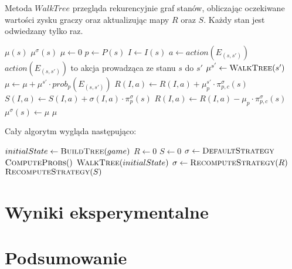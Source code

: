 \documentclass[licencjacka]{pracamgr}
\begin{document}
$\,$ \\

\noindent
Metoda $WalkTree$ przegląda rekurencyjnie graf stanów, obliczając oczekiwane wartości zysku graczy oraz
aktualizując mapy $R$ oraz $S$. Każdy stan jest odwiedzany tylko raz. \\

\begin{algorithmic}
            \State \Return $\mu(s)$
        \EndIf
            \State \Return $\mu^{\sigma}(s)$
        \EndIf
        \State $\mu \gets 0$ 
        \State $p \gets P(s)$
        \State $I \gets I(s)$
            \State $a \gets action(E_{(s, s')})$
            \Comment $action(E_{(s, s')})$ to akcja prowadząca ze stanu $s$ do $s'$
            \State $\mu^{s'} \gets \Call{WalkTree}{s'}$
            \State $\mu \gets \mu + \mu^{s'} \cdot prob_p(E_{(s, s')})$
                \State $R(I, a) \gets R(I, a) + \mu^{s'}_p \cdot \pi_{p,c}^{\sigma}(s)$
                \State $S(I, a) \gets S(I, a) + \sigma(I, a) \cdot \pi_p^{\sigma}(s)$
            \EndIf
        \EndFor
            \State $R(I, a) \gets R(I, a) - \mu_p \cdot \pi_{p,c}^{\sigma}(s)$
        \EndIf
        \State $\mu^{\sigma}(s) \gets \mu$
        \State \Return $\mu$
    \EndFunction
\end{algorithmic}

$\,$ \\

\noindent
Cały algorytm wygląda następująco: \\

\begin{algorithmic}
        \State $initialState \gets \Call{BuildTree}{game}$
        \State $R \gets 0$
        \State $S \gets 0$
        \State $\sigma \gets \Call{DefaultStrategy}{}$
            \State $\Call{ComputeProbs}{}()$
            \State $\Call{WalkTree}{initialState}$
            \State $\sigma \gets \Call{RecomputeStrategy}{R}$
        \EndFor
        \State \Return $\Call{RecomputeStrategy}{S}$
    \EndFunction
\end{algorithmic}


\chapter{Wyniki eksperymentalne}

\chapter{Podsumowanie}

 
 
\end{document}
